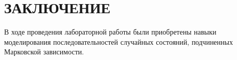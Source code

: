 \section*{ЗАКЛЮЧЕНИЕ}

В ходе проведения лабораторной работы были приобретены навыки моделирования
последовательностей случайных состояний, подчиненных Марковской зависимости.

\newpage
